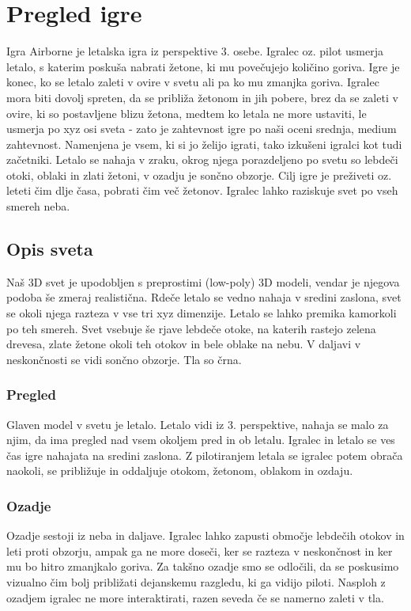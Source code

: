 \documentclass[a4paper]{article}
\begin{document}
\section{Pregled igre}%
Igra Airborne je letalska igra iz perspektive 3. osebe. Igralec oz. pilot usmerja letalo, s katerim poskuša nabrati žetone, ki mu povečujejo količino goriva. Igre je konec, ko se letalo zaleti v ovire v svetu ali pa ko mu zmanjka goriva. Igralec mora biti dovolj spreten, da se približa žetonom in jih pobere, brez da se zaleti v ovire, ki so postavljene blizu žetona, medtem ko letala ne more ustaviti, le usmerja po xyz osi sveta - zato je zahtevnost igre po naši oceni srednja, medium zahtevnost. Namenjena je vsem, ki si jo želijo igrati, tako izkušeni igralci kot tudi začetniki. Letalo se nahaja v zraku, okrog njega porazdeljeno po svetu so lebdeči otoki, oblaki in zlati žetoni, v ozadju je sončno obzorje. Cilj igre je preživeti oz. leteti čim dlje časa, pobrati čim več žetonov. Igralec lahko raziskuje svet po vseh smereh neba.

\subsection{Opis sveta}%
Naš 3D svet je upodobljen s preprostimi (low-poly) 3D modeli, vendar je njegova podoba še zmeraj realistična. Rdeče letalo se vedno nahaja v sredini zaslona, svet se okoli njega razteza v vse tri xyz dimenzije. Letalo se lahko premika kamorkoli po teh smereh. Svet vsebuje še rjave lebdeče otoke, na katerih rastejo zelena drevesa, zlate žetone okoli teh otokov in bele oblake na nebu. V daljavi v neskončnosti se vidi sončno obzorje. Tla so črna.

\subsubsection{Pregled}%
Glaven model v svetu je letalo. Letalo vidi iz 3. perspektive, nahaja se malo za njim, da ima pregled nad vsem okoljem pred in ob letalu. Igralec in letalo se ves čas igre nahajata na sredini zaslona. Z pilotiranjem letala se igralec potem obrača naokoli, se približuje in oddaljuje otokom, žetonom, oblakom in ozdaju. 

\subsubsection{Ozadje}%
Ozadje sestoji iz neba in daljave. Igralec lahko zapusti območje lebdečih otokov in leti proti obzorju, ampak ga ne more doseči, ker se razteza v neskončnost in ker mu bo hitro zmanjkalo goriva. Za takšno ozadje smo se odločili, da se poskusimo vizualno čim bolj približati dejanskemu razgledu, ki ga vidijo piloti. Nasploh z ozadjem igralec ne more interaktirati, razen seveda če se namerno zaleti v tla.
\end{document}
